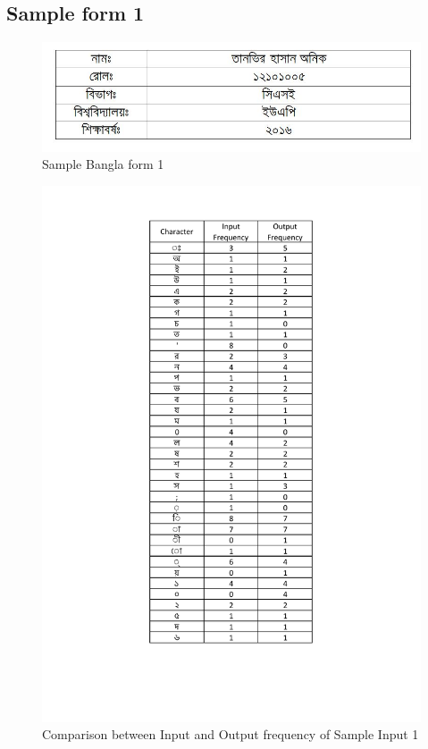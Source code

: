 \subsection{Sample form 1}
\begin{figure}[H]
\centering
\includegraphics[width=1\textwidth]{formBen01.JPG}
\caption {Sample Bangla form 1}
\label {fig:FormBan1}
\end{figure}
\begin{figure}[H]
\centering
\includegraphics[width=1\textwidth \frame]{BTform1}
\caption {Comparison between Input and Output frequency of Sample Input 1}
\label {fig:BTform1}
\end{figure}
